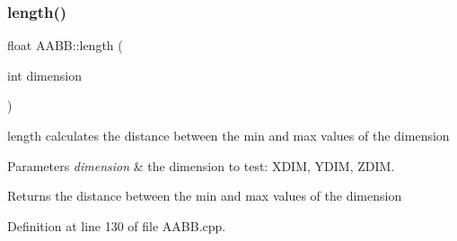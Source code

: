\subsubsection{\texorpdfstring{length()}{length()}}
{\footnotesize\ttfamily float A\+A\+B\+B\+::length (\begin{DoxyParamCaption}\item[{int}]{dimension }\end{DoxyParamCaption})}



length calculates the distance between the min and max values of the dimension 


\begin{DoxyParams}{Parameters}
{\em dimension} & the dimension to test\+: X\+D\+IM, Y\+D\+IM, Z\+D\+IM. \\
\hline
\end{DoxyParams}
\begin{DoxyReturn}{Returns}
the distance between the min and max values of the dimension 
\end{DoxyReturn}


Definition at line 130 of file A\+A\+B\+B.\+cpp.


